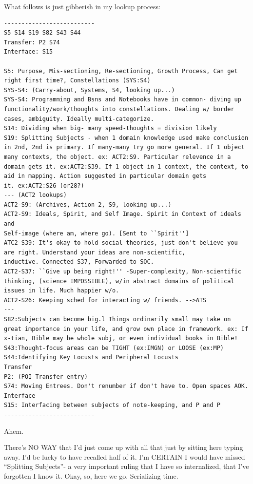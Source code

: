 \documentclass[oneside]{book}
\begin{document}
What follows is just gibberish in my lookup process:
\begin{verbatim}
--------------------------
S5 S14 S19 S82 S43 S44
Transfer: P2 S74
Interface: S15

S5: Purpose, Mis-sectioning, Re-sectioning, Growth Process, Can get
right first time?, Constellations (SYS:S4)
SYS-S4: (Carry-about, Systems, S4, looking up...)
SYS-S4: Programming and Bsns and Notebooks have in common- diving up
functionality/work/thoughts into constellations. Dealing w/ border
cases, ambiguity. Ideally multi-categorize.
S14: Dividing when big- many speed-thoughts = division likely
S19: Splitting Subjects - when 1 domain knowledge used make conclusion
in 2nd, 2nd is primary. If many-many try go more general. If 1 object
many contexts, the object. ex: ACT2:S9. Particular relevence in a
domain gets it. ex:ACT2:S39. If 1 object in 1 context, the context, to
aid in mapping. Action suggested in particular domain gets
it. ex:ACT2:S26 (or28?)
--- (ACT2 lookups)
ACT2-S9: (Archives, Action 2, S9, looking up...)
ACT2-S9: Ideals, Spirit, and Self Image. Spirit in Context of ideals  and 
Self-image (where am, where go). [Sent to ``Spirit'']
ATC2-S39: It's okay to hold social theories, just don't believe you
are right. Understand your ideas are non-scientific,
inductive. Connected S37, Forwarded to SOC.
ACT2-S37: ``Give up being right!'' -Super-complexity, Non-scientific
thinking, (science IMPOSSIBLE), w/in abstract domains of political
issues in life. Much happier w/o.
ACT2-S26: Keeping sched for interacting w/ friends. -->ATS
---
S82:Subjects can become big.l Things ordinarily small may take on
great importance in your life, and grow own place in framework. ex: If
x-tian, Bible may be whole subj, or even individual books in Bible!
S43:Thought-focus areas can be TIGHT (ex:IMGN) or LOOSE (ex:MP)
S44:Identifying Key Locusts and Peripheral Locusts
Transfer
P2: (POI Transfer entry)
S74: Moving Entrees. Don't renumber if don't have to. Open spaces AOK.
Interface
S15: Interfacing between subjects of note-keeping, and P and P
--------------------------
\end{verbatim}


Ahem.

There's NO WAY that I'd just come up with all that just by sitting
here typing away. I'd be lucky to have recalled half of it. I'm
CERTAIN I would have missed ``Splitting Subjects''- a very important
ruling that I have so internalized, that I've forgotten I know
it. Okay, so, here we go. Serializing time.
\end{document}
